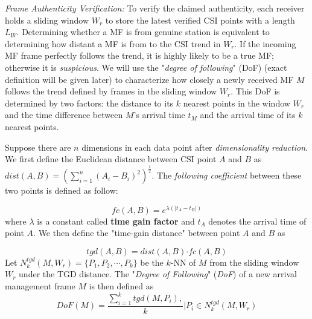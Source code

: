 \documentclass[conference]{IEEEtran}
\begin{document}
\medskip



\textit{Frame Authenticity Verification:}
To verify the claimed authenticity,
 each receiver holds a sliding window $W_r$
 to store the latest verified CSI points with a length $L_{W}$.
Determining whether a MF is from genuine station is equivalent to
 determining how distant a MF is from to the CSI trend in $W_r$.
If the incoming MF frame perfectly follows the trend, it is highly
 likely to be a true MF;  otherwise it is \emph{suspicious}.
We will use the "\emph{degree of following}" (DoF) (exact definition
will be given later) to characterize how closely   a newly received MF
 $M$ follows the trend defined by frames in the sliding window $W_r$.
This DoF is determined by two factors: the distance to its $k$ nearest
 points in the window $W_r$  and the time difference between $M$'s arrival
 time $t_M$ and the  arrival time of its $k$ nearest points.

Suppose there are $n$ dimensions in each data point after
 \textit{dimensionality reduction}.
We first define the Euclidean distance between CSI point $A$ and $B$ as
 $dist(A,B)=(\sum_{i=1}^{n}(A_i-B_i)^2)^{\frac{1}{2}}$.
 The \textit{following coefficient}
 between these two points is defined as follow:

\begin{equation*}
fc(A,B)=e^{\lambda(|t_A-t_B|)}
\end{equation*}
where $\lambda$ is a constant called \textbf{time gain factor} and $t_A$
 denotes the arrival time of point $A$.
We then define the "time-gain distance" between point $A$ and $B$ as

\begin{equation*}
tgd(A,B) = dist(A,B) \mathbf{\cdot} fc(A,B)
\end{equation*}
Let $ N^{tgd}_k(M,W_r)=\{P_1, P_2, \cdots, P_k\}$ be the $k$-NN of $M$
 from the sliding window  $W_r$ under the TGD distance.
The "\emph{Degree of Following}" (\textit{DoF}) of a new arrival
 management frame $M$ is then defined as
\begin{equation}
DoF(M)=\dfrac{\sum_{i=1}^{k} tgd(M,P_i),}{k}|P_i \in N^{tgd}_k(M,W_r)
\label{eq:dof}
\end{equation}
\end{document}
